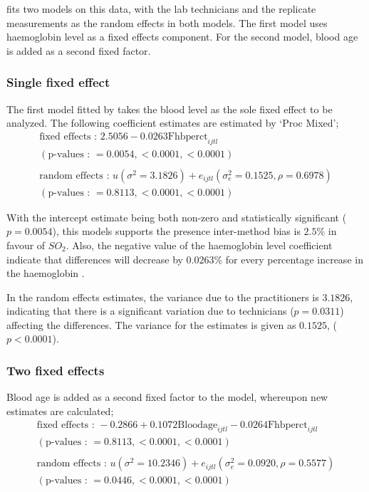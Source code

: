 \documentclass[12pt, a4paper]{report}
\theoremstyle{plain}
\theoremstyle{definition}
\theoremstyle{remark}
\begin{document}
		\citet{LaiShiao} fits two models on this data, with the lab
		technicians and the replicate measurements as the random effects
		in both models. The first model uses haemoglobin level as a fixed
		effects component. For the second model, blood age is added as a
		second fixed factor.
		
		\subsubsection{Single fixed effect} The first model fitted by \citet{LaiShiao} takes the
		blood level as the sole fixed effect to be analyzed. The following
		coefficient estimates are estimated by `Proc Mixed';
		\begin{eqnarray}
		\mbox{fixed effects :   } 2.5056 - 0.0263\mbox{Fhbperct}_{ijtl} \\
		(\mbox{p-values :   } = 0.0054, <0.0001, <0.0001)\nonumber\\\nonumber\\
		\mbox{random effects :   } u(\sigma^{2}=3.1826) + e_{ijtl}
		(\sigma^{2}_{e}=0.1525, \rho= 0.6978) \nonumber\\
		(\mbox{p-values :   } = 0.8113, <0.0001, <0.0001)\nonumber
		\end{eqnarray}
		
		With the intercept estimate being both non-zero and statistically
		significant ($p=0.0054$), this models supports the presence
		inter-method bias is $2.5\%$ in favour of $SO_{2}$. Also, the
		negative value of the haemoglobin level coefficient indicate that
		differences will decrease by $0.0263\%$ for every percentage
		increase in the haemoglobin .
		
		In the random effects estimates, the variance due to the
		practitioners is $3.1826$, indicating that there is a significant
		variation due to technicians ($p=0.0311$) affecting the
		differences. The variance for the estimates is given as $0.1525$,
		($p<0.0001$).
		
		\subsubsection{Two fixed effects}
		Blood age is added as a second fixed factor to the model,
		whereupon new estimates are calculated;
		\begin{eqnarray}
		\mbox{fixed effects :   } -0.2866 + 0.1072 \mbox{Bloodage}_{ijtl}
		- 0.0264\mbox{Fhbperct}_{ijtl}\nonumber\\
		( \mbox{p-values :   } = 0.8113, <0.0001, <0.0001)\nonumber\\\nonumber\\
		\mbox{random effects :   } u(\sigma^{2}=10.2346) + e_{ijtl}
		(\sigma^{2}_{e}=0.0920, \rho= 0.5577) \nonumber\\
		(\mbox{p-values :   } = 0.0446, <0.0001, <0.0001)
		\end{eqnarray}
		
\end{document}
